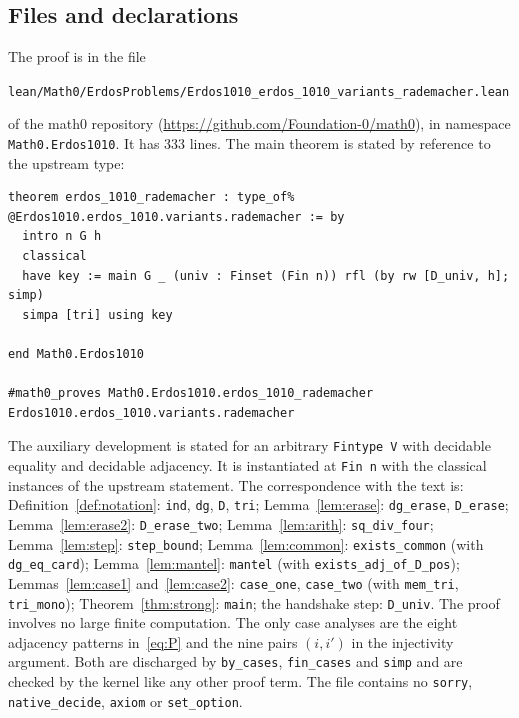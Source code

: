 \documentclass[11pt]{amsart}
\theoremstyle{plain}
\theoremstyle{definition}
\newcommand{\lean}[1]{\texttt{#1}}
\begin{document}
\subsection*{Files and declarations}
The proof is in the file
\begin{center}
\nolinkurl{lean/Math0/ErdosProblems/Erdos1010_erdos_1010_variants_rademacher.lean}
\end{center}
of the math0 repository (\url{https://github.com/Foundation-0/math0}), in namespace
\lean{Math0.Erdos1010}. It has 333 lines. The main theorem is stated by reference to the upstream
type:
\begin{lstlisting}
theorem erdos_1010_rademacher : type_of% @Erdos1010.erdos_1010.variants.rademacher := by
  intro n G h
  classical
  have key := main G _ (univ : Finset (Fin n)) rfl (by rw [D_univ, h]; simp)
  simpa [tri] using key

end Math0.Erdos1010

#math0_proves Math0.Erdos1010.erdos_1010_rademacher Erdos1010.erdos_1010.variants.rademacher
\end{lstlisting}
The auxiliary development is stated for an arbitrary \lean{Fintype V} with decidable equality and
decidable adjacency. It is instantiated at \lean{Fin n} with the classical instances of the
upstream statement. The correspondence with the text is: Definition~\ref{def:notation}:
\lean{ind}, \lean{dg}, \lean{D}, \lean{tri}; Lemma~\ref{lem:erase}: \lean{dg\_erase},
\lean{D\_erase}; Lemma~\ref{lem:erase2}: \lean{D\_erase\_two}; Lemma~\ref{lem:arith}:
\lean{sq\_div\_four}; Lemma~\ref{lem:step}: \lean{step\_bound}; Lemma~\ref{lem:common}:
\lean{exists\_common} (with \lean{dg\_eq\_card}); Lemma~\ref{lem:mantel}: \lean{mantel}
(with \lean{exists\_adj\_of\_D\_pos}); Lemmas~\ref{lem:case1} and~\ref{lem:case2}:
\lean{case\_one}, \lean{case\_two} (with \lean{mem\_tri}, \lean{tri\_mono});
Theorem~\ref{thm:strong}: \lean{main}; the handshake step: \lean{D\_univ}. The proof involves no
large finite computation. The only case analyses are the eight adjacency patterns in~\eqref{eq:P}
and the nine pairs $(i,i')$ in the injectivity argument. Both are discharged by \lean{by\_cases},
\lean{fin\_cases} and \lean{simp} and are checked by the kernel like any other proof term. The
file contains no \lean{sorry}, \lean{native\_decide}, \lean{axiom} or \lean{set\_option}.
\end{document}

